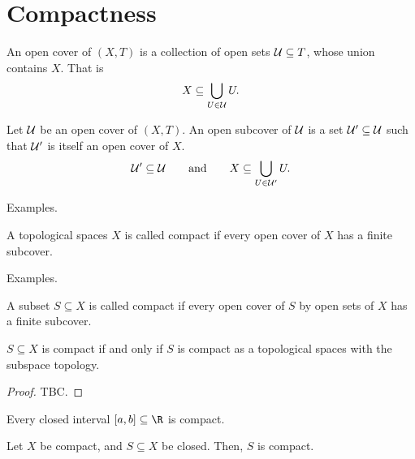 \section{Compactness}
\begin{ndfn}
  An open cover of $(X,T)$ is a collection of open sets $\mathcal{U} \subseteq T$, whose union contains $X$. That is
  \begin{equation*}
    X \subseteq \bigcup_{U \in \mathcal{U}} U.
  \end{equation*}
\end{ndfn}

\begin{ndfn}[Subcover]
  Let $\mathcal{U}$ be an open cover of $(X,T)$. An open subcover of $\mathcal{U}$ is a set $\mathcal{U}' \subseteq \mathcal{U}$ such that $\mathcal{U}'$ is itself an open cover of $X$.
  \begin{equation*}
    \mathcal{U}' \subseteq \mathcal{U}
    \qquad\text{and}\qquad
    X \subseteq \bigcup_{U \in \mathcal{U}'} U.
  \end{equation*}
\end{ndfn}

\begin{negg}
  Examples.
\end{negg}


\begin{ndfn}[Compact]
  A topological spaces $X$ is called compact if every open cover of $X$ has a finite subcover.
\end{ndfn}

\begin{negg}
  Examples.
\end{negg}

\begin{ndfn}
  A subset $S \subseteq X$ is called compact if every open cover of $S$ by open sets of $X$ has a finite subcover.
\end{ndfn}

\begin{nlemma}
  $S \subseteq X$ is compact if and only if $S$ is compact as a topological spaces with the subspace topology.
\end{nlemma}
\begin{proof}
  TBC.
\end{proof}

\begin{nthm}
  Every closed interval $[a,b] \subseteq \R$ is compact.
\end{nthm}

\begin{nthm}
  Let $X$ be compact, and $S \subseteq X$ be closed. Then, $S$ is compact.
\end{nthm}

